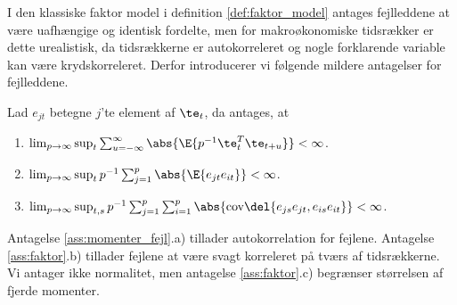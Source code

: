 I den klassiske faktor model i definition \ref{def:faktor_model} antages fejlleddene at være uafhængige og identisk fordelte, men for makroøkonomiske tidsrækker er dette urealistisk, da tidsrækkerne er autokorreleret og nogle forklarende variable kan være krydskorreleret. 
Derfor introducerer vi følgende mildere antagelser for fejlleddene.
%
\begin{ass} \label{ass:momenter_fejl}
Lad \(e_{jt}\) betegne \(j\)'te element af \(\te_t\), da antages, at
\begin{enumerate}[label=\alph*)]
\item \(\lim_{p \rightarrow \infty} \sup_t \sum_{u = - \infty}^\infty \abs{\E{p^{-1} \te_t^T \te_{t+u}}} < \infty\).
\item \(\lim_{p \rightarrow \infty} \sup_t p^{-1} \sum_{j = 1}^p \abs{\E{e_{jt} e_{it}}} < \infty\).
\item \(\lim_{p \rightarrow \infty} \sup_{t,s} p^{-1} \sum_{j=1}^p \sum_{i=1}^p \abs{\text{cov}\del{e_{js} e_{jt}, e_{is} e_{it}}} < \infty\).
\end{enumerate}
\end{ass}
%
Antagelse \ref{ass:momenter_fejl}.a) tillader autokorrelation for fejlene.
Antagelse \ref{ass:faktor}.b) tillader fejlene at være svagt korreleret på tværs af tidsrækkerne.
Vi antager ikke normalitet, men antagelse \ref{ass:faktor}.c) begrænser størrelsen af fjerde momenter.

